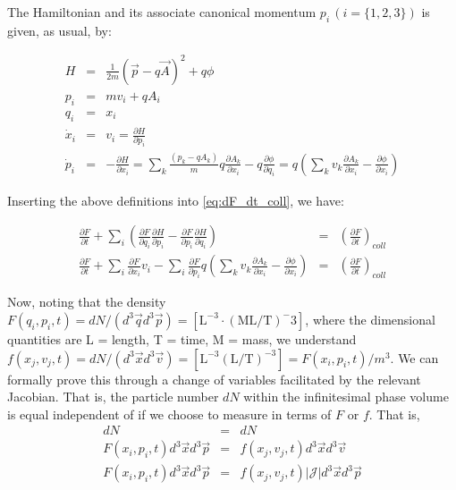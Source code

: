 \documentclass[11pt,titlepage]{report}
\begin{document}
\noindent The Hamiltonian and its associate canonical momentum $p_i \,(i = \{1,2,3\})$ is given, as usual, by:

\begin{eqnarray*}
H & = & \frac{1}{2m}(\vec{p} - q\vec{A})^2 + q\phi \\
p_i & = & mv_i + qA_i \\
q_i & = & x_i \\
\dot{x}_i & = & v_i = \frac{\partial H}{\partial p_i} \\
\dot{p}_i & = & -\frac{\partial H}{\partial x_i} = \sum_k\frac{(p_k - qA_k)}{m} q\frac{\partial A_k}{\partial x_i} - q\frac{\partial \phi }{\partial q_i} = q\left(\sum_kv_k\frac{\partial A_k}{\partial x_i} - \frac{\partial \phi }{\partial x_i}\right)
\end{eqnarray*}

\noindent Inserting the above definitions into \eqref{eq:dF_dt_coll}, we have:

\begin{eqnarray}
\frac{\partial F}{\partial t} + \sum_i \left(\frac{\partial F}{\partial q_i}\frac{\partial H}{\partial p_i} - \frac{\partial F}{\partial p_i}\frac{\partial H}{\partial q_i}\right) & =  & \left(\frac{\partial F}{\partial t}\right)_{coll}  \nonumber \\
\frac{\partial F}{\partial t} + \sum_i \frac{\partial F}{\partial x_i}v_i - \sum_i\frac{\partial F}{\partial p_i}q\left(\sum_kv_k\frac{\partial A_k}{\partial x_i} - \frac{\partial \phi }{\partial x_i}\right) & = & \left(\frac{\partial F}{\partial t}\right)_{coll} \label{eq:dF_dt_coll2}
\end{eqnarray}

Now, noting that the density $F(q_i,p_i,t) = dN / (d^3\vec{q}d^3\vec{p}) = \mathrm{[L^{-3} \cdot (M L/T)^-3]}$, where the dimensional quantities are L = length, T = time, M = mass, we understand $f(x_j,v_j,t) = dN / (d^3\vec{x}d^3\vec{v}) = \mathrm{[L^{-3} (L/T)^{-3}]} = F(x_i,p_i,t) / m^3$. We can formally prove this through a change of variables facilitated by the relevant Jacobian. That is, the particle number $dN$ within the infinitesimal phase volume is equal independent of if we choose to measure in terms of $F$ or $f$. That is,
\begin{eqnarray}
dN & = & dN \nonumber \\
F(x_i,p_i,t)d^3\vec{x}d^3\vec{p} & = & f(x_j,v_j,t) d^3\vec{x}d^3\vec{v}\nonumber  \\
F(x_i,p_i,t)d^3\vec{x}d^3\vec{p} & = & f(x_j,v_j,t) |\mathcal{J}| d^3\vec{x}d^3\vec{p} \label{eq:F_f_jacobian}
\end{eqnarray}
\end{document}
